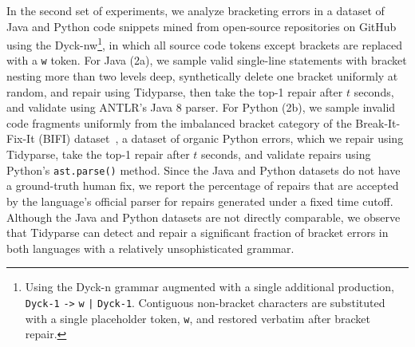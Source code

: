 \documentclass[runningheads]{llncs}
\begin{document}
In the second set of experiments, we analyze bracketing errors in a dataset of Java and Python code snippets mined from open-source repositories on GitHub using the Dyck-nw\footnote{Using the Dyck-n grammar augmented with a single additional production, \texttt{Dyck-1} {\color{blue}\texttt{->}} \texttt{w} {\color{blue}\texttt{|}} \texttt{Dyck-1}. Contiguous non-bracket characters are substituted with a single placeholder token, \texttt{w}, and restored verbatim after bracket repair.}, in which all source code tokens except brackets are replaced with a \texttt{w} token. For Java (2a), we sample valid single-line statements with bracket nesting more than two levels deep, synthetically delete one bracket uniformly at random, and repair using Tidyparse, then take the top-1 repair after $t$ seconds, and validate using ANTLR's Java 8 parser. For Python (2b), we sample invalid code fragments uniformly from the imbalanced bracket category of the Break-It-Fix-It (BIFI) dataset~\cite{yasunaga2021break}, a dataset of organic Python errors, which we repair using Tidyparse, take the top-1 repair after $t$ seconds, and validate repairs using Python's \texttt{ast.parse()} method. Since the Java and Python datasets do not have a ground-truth human fix, we report the percentage of repairs that are accepted by the language's official parser for repairs generated under a fixed time cutoff. Although the Java and Python datasets are not directly comparable, we observe that Tidyparse can detect and repair a significant fraction of bracket errors in both languages with a relatively unsophisticated grammar.

%

%

%
%
%
 
 
\end{document}
